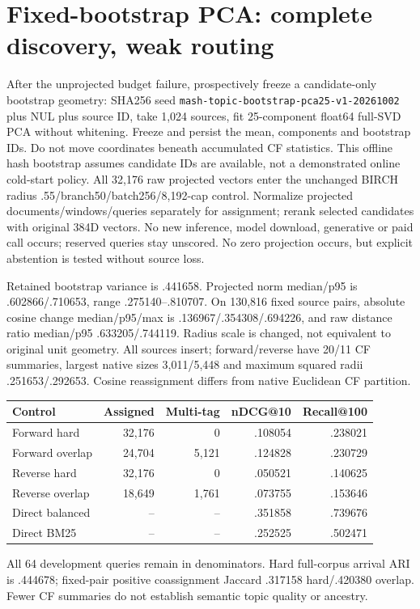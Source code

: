 \documentclass[11pt]{article}
\begin{document}
\section{Fixed-bootstrap PCA: complete discovery, weak routing}
After the unprojected budget failure, prospectively freeze a candidate-only
bootstrap geometry: SHA256 seed \texttt{mash-topic-bootstrap-pca25-v1-20261002}
plus NUL plus source ID, take 1,024 sources, fit 25-component float64 full-SVD
PCA without whitening\cite{pcareference}. Freeze and persist the mean,
components and bootstrap IDs. Do not move coordinates beneath accumulated CF
statistics. This offline hash bootstrap assumes candidate IDs are available,
not a demonstrated online cold-start policy. All 32,176 raw projected vectors
enter the unchanged BIRCH radius .55/branch50/batch256/8,192-cap control.
Normalize projected documents/windows/queries separately for assignment;
rerank selected candidates with original 384D vectors. No new inference,
model download, generative or paid call occurs; reserved queries stay unscored.
No zero projection occurs, but explicit abstention is tested without source loss.

Retained bootstrap variance is .441658. Projected norm median/p95 is
.602866/.710653, range .275140--.810707. On 130,816 fixed source pairs,
absolute cosine change median/p95/max is .136967/.354308/.694226, and raw
distance ratio median/p95 .633205/.744119. Radius scale is changed, not
equivalent to original unit geometry. All sources insert; forward/reverse have
20/11 CF summaries, largest native sizes 3,011/5,448 and maximum squared radii
.251653/.292653. Cosine reassignment differs from native Euclidean CF partition.

\begin{center}\small
\begin{tabular}{lrrrr}
\toprule
Control & Assigned & Multi-tag & nDCG@10 & Recall@100\\
\midrule
Forward hard & 32,176 & 0 & .108054 & .238021\\
Forward overlap & 24,704 & 5,121 & .124828 & .230729\\
Reverse hard & 32,176 & 0 & .050521 & .140625\\
Reverse overlap & 18,649 & 1,761 & .073755 & .153646\\
Direct balanced & -- & -- & .351858 & .739676\\
Direct BM25 & -- & -- & .252525 & .502471\\
\bottomrule
\end{tabular}\end{center}
All 64 development queries remain in denominators. Hard full-corpus arrival
ARI is .444678; fixed-pair positive coassignment Jaccard .317158 hard/.420380
overlap. Fewer CF summaries do not establish semantic topic quality or ancestry.
\end{document}
